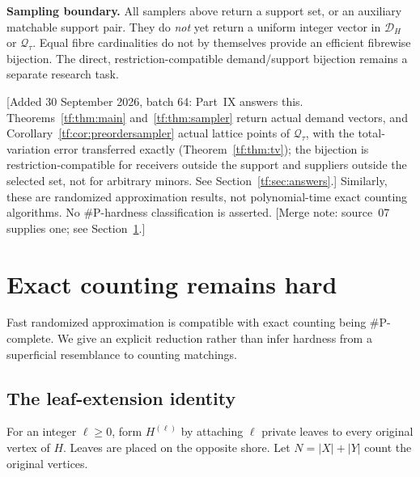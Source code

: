 \documentclass[11pt]{article}
\numberwithin{equation}{section}
\theoremstyle{definition}
\newcommand{\Qt}{\mathcal Q_\tau}
\newcommand{\cD}{\mathcal D}
\begin{document}
\begin{statusbox}
\textbf{Sampling boundary.} All samplers above return a support set, or an
auxiliary matchable support pair. They do \emph{not} yet return a uniform
integer vector in $\cD_H$ or $\Qt$. Equal fibre cardinalities do not
by themselves provide an efficient fibrewise bijection. The direct,
restriction-compatible demand/support bijection remains a separate
research task.
\end{statusbox}
[Added 30 September 2026, batch 64: Part~IX answers this.
Theorems~\ref{tf:thm:main} and~\ref{tf:thm:sampler} return actual demand
vectors, and Corollary~\ref{tf:cor:preordersampler} actual lattice points
of $\Qt$, with the total-variation error transferred exactly
(Theorem~\ref{tf:thm:tv}); the bijection is restriction-compatible for
receivers outside the support and suppliers outside the selected set, not
for arbitrary minors. See Section~\ref{tf:sec:answers}.]
Similarly, these are randomized approximation results, not polynomial-time
exact counting algorithms. No \#P-hardness classification is asserted.
[Merge note: source~07 supplies one; see Section~\ref{lor:sp:sec:hardness}.]

\section{Exact counting remains hard}
\label{lor:sp:sec:hardness}

Fast randomized approximation is compatible with exact counting being
$\#\mathrm P$-complete. We give an explicit reduction rather than infer hardness
from a superficial resemblance to counting matchings.

\subsection{The leaf-extension identity}
For an integer $\ell\ge0$, form $H^{(\ell)}$ by attaching $\ell$ private leaves
to every original vertex of $H$. Leaves are placed on the opposite shore.
Let $N=|X|+|Y|$ count the original vertices.
\end{document}
